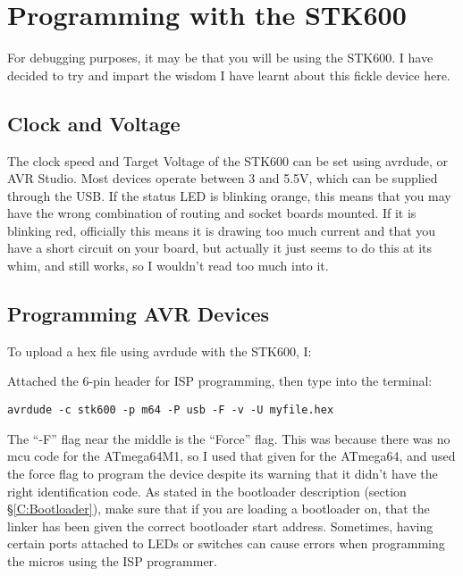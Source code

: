 \documentclass[a4paper, oneside, 11pt, titlepage, onecolumn, openright]{report}
\begin{document}
			
\chapter{Programming with the STK600}
			\label{C:STK600}
			For debugging purposes, it may be that you will be using the STK600. I have decided to try and impart the wisdom I have learnt about this fickle device here.
			
\section{Clock and Voltage}
			\label{STK600ClockVoltage}
			The clock speed and Target Voltage of the STK600 can be set using avrdude, or AVR Studio. Most devices operate between 3 and 5.5V, which can be supplied through the USB.\newline
			If the status LED is blinking orange, this means that you may have the wrong combination of routing and socket boards mounted. If it is blinking red, officially this means it is drawing too much current and that you have a short circuit on your board, but actually it just seems to do this at its whim, and still works, so I wouldn't read too much into it.			
			
\section{Programming AVR Devices}
			\label{s:STK600AVRDevices}
			To upload a hex file using avrdude with the STK600, I:\newline
			
			Attached the 6-pin header for ISP programming, then type into the terminal:
			
\begin{lstlisting}[frame=trBL, breaklines=true]
 avrdude -c stk600 -p m64 -P usb -F -v -U myfile.hex 
\end{lstlisting}

			The ``-F'' flag near the middle is the ``Force'' flag. This was because there was no mcu code for the ATmega64M1, so I used that given for the ATmega64, and used the force flag to program the device despite its warning that it didn't have the right identification code. \newline
			As stated in the bootloader description (section \S\ref{C:Bootloader}), make sure that if you are loading a bootloader on, that the linker has been given the correct bootloader start address.\newline
			Sometimes, having certain ports attached to LEDs or switches can cause errors when programming the micros using the ISP programmer.
			
\end{document}
